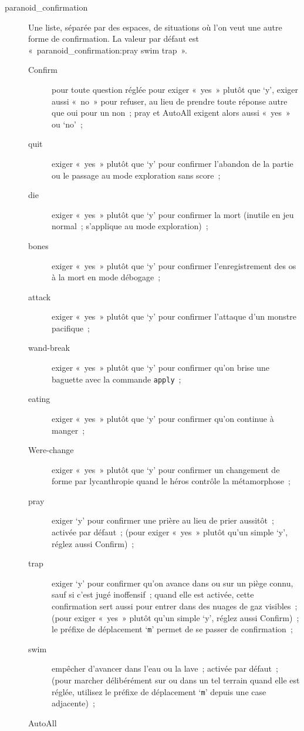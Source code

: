 \documentclass[titlepage]{article}
\begin{document}
\begin{description}
\item[{paranoid\_confirmation}]
Une liste, séparée par des espaces, de situations où l'on veut une autre
forme de confirmation.
La valeur par défaut est «~paranoid\_confirmation:pray swim trap~».
\begin{description}
\item[{Confirm}]
pour toute question réglée pour exiger «~yes~» plutôt que
`y', exiger aussi «~no~» pour refuser, au lieu de prendre toute
réponse autre que oui pour un non~; pray et AutoAll exigent alors aussi
«~yes~» ou `no'~;
\item[{quit}]
exiger «~yes~» plutôt que `y' pour confirmer l'abandon de la
partie ou le passage au mode exploration sans score~;
\item[{die}]
exiger «~yes~» plutôt que `y' pour confirmer la mort (inutile en
jeu normal~; s'applique au mode exploration)~;
\item[{bones}]
exiger «~yes~» plutôt que `y' pour confirmer l'enregistrement des
os à la mort en mode débogage~;
\item[{attack}]
exiger «~yes~» plutôt que `y' pour confirmer l'attaque d'un
monstre pacifique~;
\item[{wand-break}]
exiger «~yes~» plutôt que `y' pour confirmer qu'on brise une
baguette avec la commande \texttt{apply}~;
\item[{eating}]
exiger «~yes~» plutôt que `y' pour confirmer qu'on continue à
manger~;
\item[{Were-change}]
exiger «~yes~» plutôt que `y' pour confirmer un changement de
forme par lycanthropie quand le héros contrôle la métamorphose~;
\item[{pray}]
exiger `y' pour confirmer une prière au lieu de prier aussitôt~;
activée par défaut~; (pour exiger «~yes~» plutôt qu'un simple
`y', réglez aussi Confirm)~;
\item[{trap}]
exiger `y' pour confirmer qu'on avance dans ou sur un piège connu,
sauf si c'est jugé inoffensif~; quand elle est activée, cette confirmation
sert aussi pour entrer dans des nuages de gaz visibles~; (pour exiger
«~yes~» plutôt qu'un simple `y', réglez aussi Confirm)~; le
préfixe de déplacement `\texttt{m}' permet de se passer de
confirmation~;
\item[{swim}]
empêcher d'avancer dans l'eau ou la lave~; activée par défaut~; (pour
marcher délibérément sur ou dans un tel terrain quand elle est réglée,
utilisez le préfixe de déplacement `\texttt{m}' depuis une case
adjacente)~;
\item[{AutoAll}]

\end{description}
\end{description}
\end{document}
